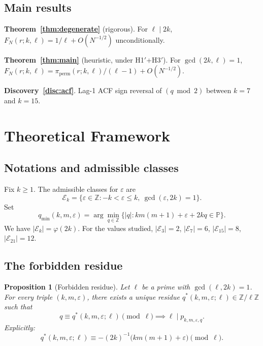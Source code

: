 \documentclass[11pt,a4paper]{article}
\theoremstyle{plain}
\newtheorem{proposition}[theorem]{Proposition}
\theoremstyle{definition}
\newcommand{\qmin}{q_{\min}}
\newcommand{\Z}{\mathbb{Z}}
\newcommand{\Prim}{\mathbb{P}}
\newcommand{\PiP}{\pi_{\mathrm{perm}}}
\newcommand{\eps}{\varepsilon}
\newcommand{\Eclass}{\mathcal{E}}
\begin{document}
\subsection{Main results}

\textbf{Theorem~\ref{thm:degenerate}} (rigorous). For $\ell \mid 2k$,
$F_N(r; k, \ell) = 1/\ell + O(N^{-1/2})$ unconditionally.

\medskip
\textbf{Theorem~\ref{thm:main}} (heuristic, under H1$'$+H3$'$). For
$\gcd(2k, \ell) = 1$, $F_N(r; k, \ell) = \PiP(r; k, \ell)/(\ell-1) + O(N^{-1/2})$.

\medskip
\textbf{Discovery~\ref{disc:acf}}. Lag-1 ACF sign reversal of $(q \bmod 2)$ between
$k = 7$ and $k = 15$.

\section{Theoretical Framework}
\label{sec:framework}

\subsection{Notations and admissible classes}

Fix $k \ge 1$. The admissible classes for $\eps$ are
\[
\Eclass_k = \{\eps \in \Z : -k < \eps \le k,\ \gcd(\eps, 2k) = 1\}.
\]
Set
\[
\qmin(k, m, \eps) = \arg\min_{q \in \Z}\{|q| : km(m+1) + \eps + 2kq \in \Prim\}.
\]
We have $|\Eclass_k| = \varphi(2k)$. For the values studied,
$|\Eclass_3| = 2$, $|\Eclass_7| = 6$, $|\Eclass_{15}| = 8$, $|\Eclass_{21}| = 12$.

\subsection{The forbidden residue}

\begin{rigorousbox}
\begin{proposition}[Forbidden residue]\label{prop:forbidden}
Let $\ell$ be a prime with $\gcd(\ell, 2k) = 1$. For every triple $(k, m, \eps)$,
there exists a unique residue $q^*(k, m, \eps; \ell) \in \Z/\ell\Z$ such that
\[
q \equiv q^*(k, m, \eps; \ell) \pmod{\ell} \implies \ell \mid p_{k, m, \eps, q}.
\]
Explicitly:
\begin{equation}
q^*(k, m, \eps; \ell) \equiv -(2k)^{-1}\bigl(km(m+1) + \eps\bigr) \pmod{\ell}.
\label{eq:qstar}
\end{equation}
\end{proposition}
\end{rigorousbox}
\end{document}
